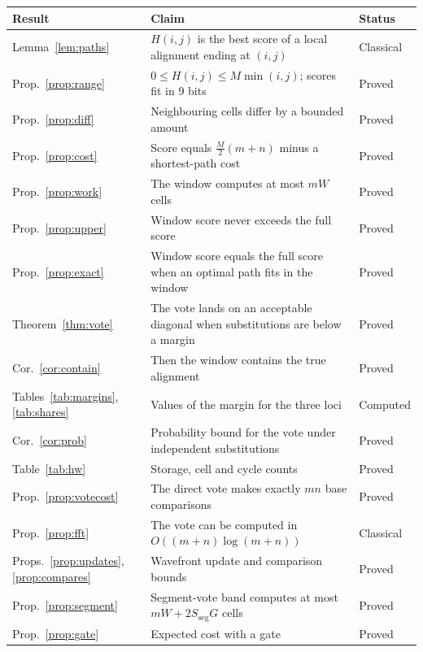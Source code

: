 \documentclass[11pt]{article}
\theoremstyle{plain}
\theoremstyle{definition}
\theoremstyle{remark}
\newcommand{\Sseg}{S_{\mathrm{seg}}}
\begin{document}
\begin{center}
\begin{tabular}{@{}l>{\raggedright\arraybackslash}p{}l@{}}
\toprule
Result & Claim & Status \\
\midrule
Lemma~\ref{lem:paths} & $H(i,j)$ is the best score of a local alignment ending at $(i,j)$ & Classical \\
Prop.~\ref{prop:range} & $0 \le H(i,j) \le M\min(i,j)$; scores fit in 9 bits & Proved \\
Prop.~\ref{prop:diff} & Neighbouring cells differ by a bounded amount & Proved \\
Prop.~\ref{prop:cost} & Score equals $\tfrac{M}{2}(m+n)$ minus a shortest-path cost & Proved \\
Prop.~\ref{prop:work} & The window computes at most $mW$ cells & Proved \\
Prop.~\ref{prop:upper} & Window score never exceeds the full score & Proved \\
Prop.~\ref{prop:exact} & Window score equals the full score when an optimal path fits in the window & Proved \\
Theorem~\ref{thm:vote} & The vote lands on an acceptable diagonal when substitutions are below a margin & Proved \\
Cor.~\ref{cor:contain} & Then the window contains the true alignment & Proved \\
Tables~\ref{tab:margins}, \ref{tab:shares} & Values of the margin for the three loci & Computed \\
Cor.~\ref{cor:prob} & Probability bound for the vote under independent substitutions & Proved \\
Table~\ref{tab:hw} & Storage, cell and cycle counts & Proved \\
Prop.~\ref{prop:votecost} & The direct vote makes exactly $mn$ base comparisons & Proved \\
Prop.~\ref{prop:fft} & The vote can be computed in $O((m+n)\log(m+n))$ & Classical \\
Props.~\ref{prop:updates}, \ref{prop:compares} & Wavefront update and comparison bounds & Proved \\
Prop.~\ref{prop:segment} & Segment-vote band computes at most $mW + 2\Sseg G$ cells & Proved \\
Prop.~\ref{prop:gate} & Expected cost with a gate & Proved \\
\bottomrule
\end{tabular}
\end{center}
\end{document}
